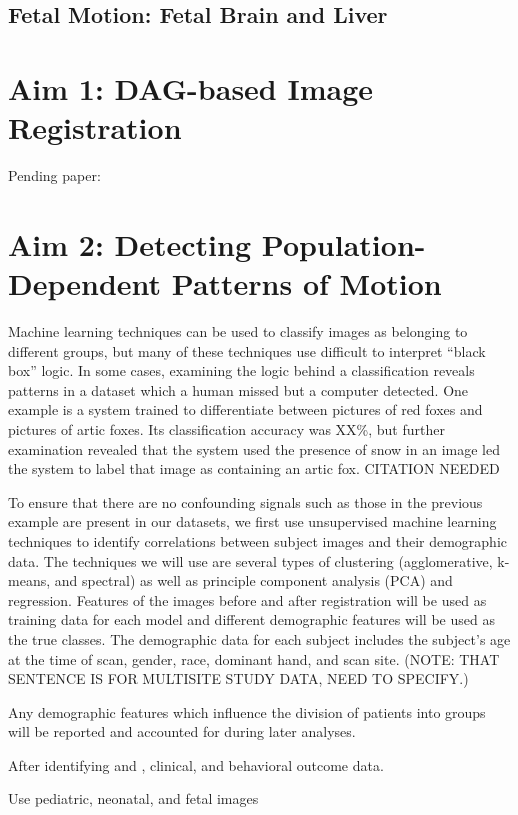 \subsection{Fetal Motion: Fetal Brain and Liver}


\section{Aim 1: DAG-based Image Registration}

Pending paper: 

\section{Aim 2: Detecting Population-Dependent Patterns of Motion}

Machine learning techniques can be used to classify images as belonging to different groups, but many of these techniques use difficult to interpret ``black box'' logic. In some cases, examining the logic behind a classification reveals patterns in a dataset which a human missed but a computer detected. One example is a system trained to differentiate between pictures of red foxes and pictures of artic foxes. Its classification accuracy was XX\%, but further examination revealed that the system used the presence of snow in an image led the system to label that image as containing an artic fox. CITATION NEEDED

To ensure that there are no confounding signals such as those in the previous example are present in our datasets, we first use unsupervised machine learning techniques to identify correlations between subject images and their demographic data. The techniques we will use are several types of clustering (agglomerative, k-means, and spectral) as well as principle component analysis (PCA) and regression. Features of the images before and after registration will be used as training data for each model and different demographic features will be used as the true classes. The demographic data for each subject includes the subject's age at the time of scan, gender, race, dominant hand, and scan site. (NOTE: THAT SENTENCE IS FOR MULTISITE STUDY DATA, NEED TO SPECIFY.)

Any demographic features which influence the division of patients into groups will be reported and accounted for during later analyses.

After identifying and , clinical, and behavioral outcome data. 

Use pediatric, neonatal, and fetal images

